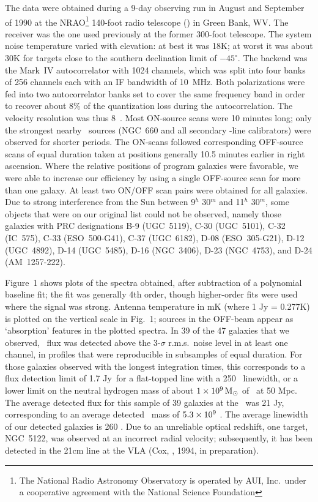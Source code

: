 The data were obtained during a 9-day observing run in August and September
of 1990 at the 
NRAO\footnote{The National Radio Astronomy Observatory is operated
by AUI, Inc.\ under a cooperative agreement with the National Science
Foundation} 140-foot radio telescope () in Green Bank, WV.  
The receiver was the one used previously
at the former 300-foot telescope.  The system noise temperature varied with
elevation:  at best it was 18K; at worst it was about 30K for targets 
close to the southern declination limit of $-45^\circ$.  
The backend was the Mark~IV
autocorrelator with 1024 channels, which was split into four banks of 256
channels each with an IF bandwidth of 10~MHz.  Both polarizations were fed
into two autocorrelator banks 
set to cover the same frequency band in order 
to recover about 8\% of the quantization
loss during the autocorrelation.  The velocity resolution was thus 8~\KMS.
Most ON-source scans were 10 minutes long; 
only the strongest nearby \HI\ sources (\ie NGC~660 and all secondary 
\HI-line calibrators) were observed for shorter
periods.  The ON-scans followed corresponding 
OFF-source scans of equal duration taken at positions generally 
10.5 minutes earlier in right ascension.  
Where the relative positions of program galaxies were favorable, we were able  
to increase our efficiency by using a single 
OFF-source scan for more than one galaxy.
At least two ON/OFF scan pairs were obtained for all
galaxies.  
Due to strong interference from the Sun between 9$^h$ 30$^m$ and 11$^h$ 30$^m$,
some objects that were on our original list could not be observed,  
namely those galaxies with PRC designations B-9 (UGC~5119), C-30 (UGC~5101), 
C-32 (IC~575), C-33 (ESO~500-G41), C-37 (UGC~6182), D-08 (ESO~305-G21),
D-12 (UGC~4892), D-14 (UGC~5485), D-16 (NGC~3406), D-23 (NGC~4753), 
and D-24 (AM~1257-222).  

Figure~1 shows plots of the spectra obtained, after subtraction of a
polynomial baseline fit; the fit was generally 4th order, though
higher-order fits were used where the signal was strong. 
Antenna temperature in mK (where 1 Jy = 0.277K) is plotted on the 
vertical scale in Fig.~1; sources in the OFF-beam appear as 
`absorption' features in the plotted spectra.  
In 39 of the 47 galaxies that we observed, \HI\ flux was detected above the 
3-$\sigma$ r.m.s.\ noise level in at least one channel,   
in profiles that were reproducible in subsamples of equal duration.
For those galaxies observed with the longest integration times, 
this corresponds to a flux detection limit of 1.7 Jy\CDOT\KMS\ for a 
flat-topped line with a 250 \KMS\ linewidth, or a lower limit 
on the neutral hydrogen mass of about $1 \times 10^9 {\,{\rm M}_\odot}$ of \HI\ at 50 Mpc.  
The average detected flux for this sample of 39 galaxies at the \ 
was 21 Jy\CDOT\KMS, corresponding to an average detected \HI\ 
mass of $\rm 5.3 \times 10^9$ \MSUN. 
The average linewidth of our detected galaxies is 260 \KMS.
Due to an unreliable optical redshift, one target, NGC~5122, 
was observed at an incorrect radial velocity; subsequently, 
it has been detected in the 21cm line at the VLA 
(Cox, \etal, 1994, in preparation).  
\vfil\eject

